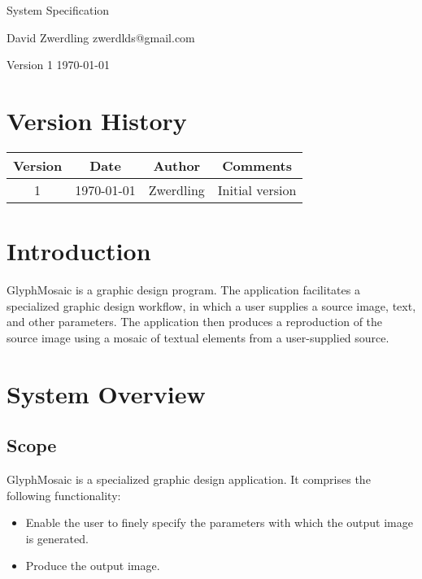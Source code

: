 \documentclass{article}
\newcommand{\docauth}[2]{
  \raggedright
  \Large
  {#1} \newline
  \small
  {#2}
  \vspace{1.5em}
  \newline
  \normalsize
}
\begin{document}
\begin{titlepage}
  \begin{center}
    
    
    \LARGE
    System Specification
  \end{center}

  \vfill

  \docauth{David Zwerdling}{zwerdlds@gmail.com}

  \vspace{1em}

  \large
  Version 1 \newline
  \today
  \normalsize
\end{titlepage}
\restoregeometry

\newpage



\section{Version History}
\begin{adjustbox}{width=\textwidth}
  \begin{tabular}{ |c|c|c|c| }
    \hline
    Version & Date   & Author      & Comments          \\
    \hline
    \hline
    1       & \today & {Zwerdling} & {Initial version} \\
    \hline
  \end{tabular}
\end{adjustbox}
\newpage



\tableofcontents \newpage



\section{Introduction}
GlyphMosaic is a graphic design program.
The application facilitates a specialized graphic design workflow, in which a user supplies a source image, text, and other parameters.
The application then produces a reproduction of the source image using a mosaic of textual elements from a user-supplied source.


\section{System Overview}
\subsection{Scope}
GlyphMosaic is a specialized graphic design application.
It comprises the following functionality:
\begin{itemize}
  \item Enable the user to finely specify the parameters with which the output image is generated.
  \item Produce the output image.
\end{itemize}
\end{document}
